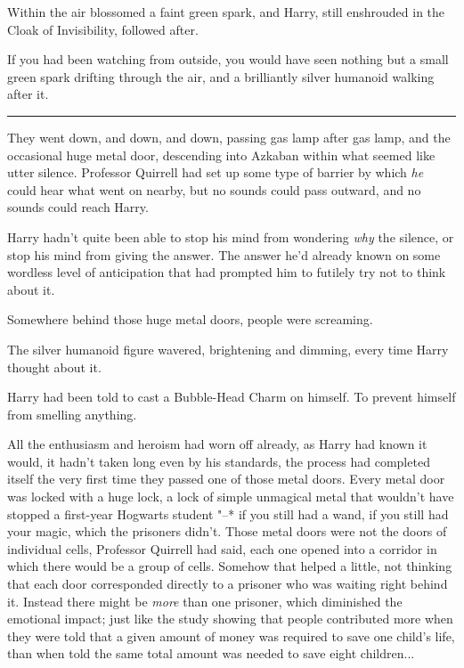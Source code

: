 Within the air blossomed a faint green spark, and Harry, still
enshrouded in the Cloak of Invisibility, followed after.

If you had been watching from outside, you would have seen nothing but a
small green spark drifting through the air, and a brilliantly silver
humanoid walking after it.

\begin{center}\rule{3in}{0.4pt}\end{center}

They went down, and down, and down, passing gas lamp after gas lamp, and
the occasional huge metal door, descending into Azkaban within what
seemed like utter silence. Professor Quirrell had set up some type of
barrier by which \emph{he} could hear what went on nearby, but no sounds
could pass outward, and no sounds could reach Harry.

Harry hadn't quite been able to stop his mind from wondering \emph{why}
the silence, or stop his mind from giving the answer. The answer he'd
already known on some wordless level of anticipation that had prompted
him to futilely try not to think about it.

Somewhere behind those huge metal doors, people were screaming.

The silver humanoid figure wavered, brightening and dimming, every time
Harry thought about it.

Harry had been told to cast a Bubble-Head Charm on himself. To prevent
himself from smelling anything.

All the enthusiasm and heroism had worn off already, as Harry had known
it would, it hadn't taken long even by his standards, the process had
completed itself the very first time they passed one of those metal
doors. Every metal door was locked with a huge lock, a lock of simple
unmagical metal that wouldn't have stopped a first-year Hogwarts student
"--* if you still had a wand, if you still had your magic, which the
prisoners didn't. Those metal doors were not the doors of individual
cells, Professor Quirrell had said, each one opened into a corridor in
which there would be a group of cells. Somehow that helped a little, not
thinking that each door corresponded directly to a prisoner who was
waiting right behind it. Instead there might be \emph{more} than one
prisoner, which diminished the emotional impact; just like the study
showing that people contributed more when they were told that a given
amount of money was required to save one child's life, than when told
the same total amount was needed to save eight children...


